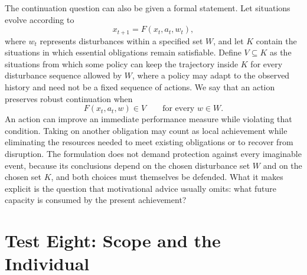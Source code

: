 \documentclass[12pt]{article}
\begin{document}
The continuation question can also be given a formal statement. Let situations evolve according to
\[
x_{t+1}=F(x_t,a_t,w_t),
\]
where $w_t$ represents disturbances within a specified set $W$, and let $K$ contain the situations in which essential obligations remain satisfiable. Define $V\subseteq K$ as the situations from which some policy can keep the trajectory inside $K$ for every disturbance sequence allowed by $W$, where a policy may adapt to the observed history and need not be a fixed sequence of actions. We say that an action preserves robust continuation when
\[
F(x_t,a_t,w)\in V\qquad\text{for every } w\in W.
\]
An action can improve an immediate performance measure while violating that condition. Taking on another obligation may count as local achievement while eliminating the resources needed to meet existing obligations or to recover from disruption. The formulation does not demand protection against every imaginable event, because its conclusions depend on the chosen disturbance set $W$ and on the chosen set $K$, and both choices must themselves be defended. What it makes explicit is the question that motivational advice usually omits: what future capacity is consumed by the present achievement?

\section{Test Eight: Scope and the Individual}\label{sec:t8}
\end{document}
